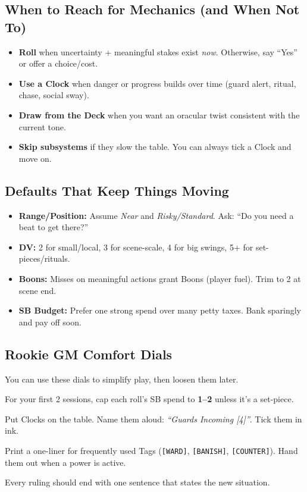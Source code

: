 \subsection{When to Reach for Mechanics (and When Not To)}
\begin{itemize}
  \item \textbf{Roll} when uncertainty + meaningful stakes exist \emph{now}. Otherwise, say ``Yes'' or offer a choice/cost.
  \item \textbf{Use a Clock} when danger or progress builds over time (guard alert, ritual, chase, social sway).
  \item \textbf{Draw from the Deck} when you want an oracular twist consistent with the current tone.
  \item \textbf{Skip subsystems} if they slow the table. You can always tick a Clock and move on.
\end{itemize}

\subsection{Defaults That Keep Things Moving}
\begin{itemize}
  \item \textbf{Range/Position:} Assume \emph{Near} and \emph{Risky/Standard}. Ask: ``Do you need a beat to get there?''
  \item \textbf{DV:} 2 for small/local, 3 for scene-scale, 4 for big swings, 5+ for set-pieces/rituals.
  \item \textbf{Boons:} Misses on meaningful actions grant Boons (player fuel). Trim to 2 at scene end.
  \item \textbf{SB Budget:} Prefer one strong spend over many petty taxes. Bank sparingly and pay off soon.
\end{itemize}

\subsection{Rookie GM Comfort Dials}
You can use these dials to simplify play, then loosen them later.
\begin{description}[leftmargin=1.5em, style=nextline]
  \item[Soft SB:] For your first 2 sessions, cap each roll’s SB spend to \textbf{1--2} unless it’s a set-piece.
  \item[Visible Clocks:] Put Clocks on the table. Name them aloud: \emph{``Guards Incoming [4]''}. Tick them in ink.
  \item[Tag Cards:] Print a one-liner for frequently used Tags (\texttt{[WARD]}, \texttt{[BANISH]}, \texttt{[COUNTER]}). Hand them out when a power is active.
  \item[One Move, One Sentence:] Every ruling should end with one sentence that states the new situation.
\end{description}

